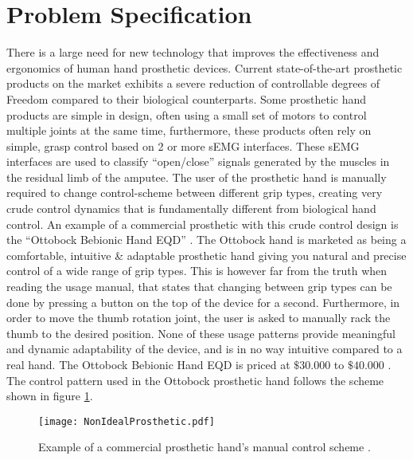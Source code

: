 \documentclass[../main.tex]{subfiles}
\begin{document}
\section{Problem Specification}

There is a large need for new technology that improves the effectiveness and ergonomics of human hand prosthetic devices.
Current state-of-the-art prosthetic products on the market exhibits a severe reduction of controllable degrees of Freedom compared to their biological counterparts.
Some prosthetic hand products are simple in design, often using a small set of motors to control multiple joints at the same time, furthermore, these products often rely on simple, grasp control based on 2 or more \gls{sEMG} interfaces.
These \gls{sEMG} interfaces are used to classify ``open/close'' signals generated by the muscles in the residual limb of the amputee.
The user of the prosthetic hand is manually required to change control-scheme between different grip types, creating very crude control dynamics that is fundamentally different from biological hand control.
An example of a commercial prosthetic with this crude control design is the ``Ottobock Bebionic Hand EQD'' \cite{ottobock}.
The Ottobock hand is marketed as being a comfortable, intuitive \& adaptable prosthetic hand giving you natural and precise control of a wide range of grip types.
This is however far from the truth when reading the usage manual, that states that changing between grip types can be done by pressing a button on the top of the device for a second.
Furthermore, in order to move the thumb rotation joint, the user is asked to manually rack the thumb to the desired position.
None of these usage patterns provide meaningful and dynamic adaptability of the device, and is in no way intuitive compared to a real hand.
The Ottobock Bebionic Hand EQD is priced at $\$30.000$ to $\$40.000$ \cite{ottobock-prices}.
The control pattern used in the Ottobock prosthetic hand follows the scheme shown in figure \ref{fig:nonidealprosthetic}.

\begin{figure}[H]
\begin{center}
\texttt{[image: NonIdealProsthetic.pdf]}
\caption{Example of a commercial prosthetic hand's manual control scheme \cite{ottobock}.}
\label{fig:nonidealprosthetic}
\end{center}
\end{figure}

\end{document}
